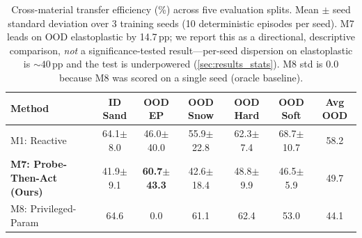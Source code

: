 \begin{table}[t]
\centering
\caption{Cross-material transfer efficiency (\%) across five evaluation splits. Mean $\pm$ seed standard deviation over 3 training seeds (10 deterministic episodes per seed). M7 leads on OOD elastoplastic by 14.7\,pp; we report this as a directional, descriptive comparison, \emph{not} a significance-tested result---per-seed dispersion on elastoplastic is $\sim 40$\,pp and the test is underpowered (\cref{sec:results_stats}). M8 std is $0.0$ because M8 was scored on a single seed (oracle baseline).}
\label{tab:main_results}
\begin{tabular}{lcccccc}
\toprule
Method & ID Sand & OOD EP & OOD Snow & OOD Hard & OOD Soft & Avg OOD \\
\midrule
M1: Reactive & 64.1$\pm$8.0 & 46.0$\pm$40.0 & 55.9$\pm$22.8 & 62.3$\pm$7.4 & 68.7$\pm$10.7 & 58.2 \\
\textbf{M7: Probe-Then-Act (Ours)} & 41.9$\pm$9.1 & \textbf{60.7$\pm$43.3} & 42.6$\pm$18.4 & 48.8$\pm$9.9 & 46.5$\pm$5.9 & 49.7 \\
M8: Privileged-Param & 64.6 & 0.0 & 61.1 & 62.4 & 53.0 & 44.1 \\
\bottomrule
\end{tabular}
\end{table}
